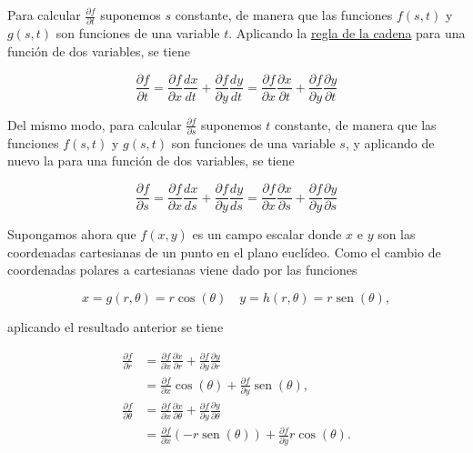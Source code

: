 \documentclass[
  a4paper,
]{scrreport}
\theoremstyle{definition}
\theoremstyle{remark}
\begin{document}
\begin{tcolorbox}[enhanced jigsaw, toprule=.15mm, coltitle=black, colframe=quarto-callout-tip-color-frame, leftrule=.75mm, breakable, left=2mm, opacitybacktitle=0.6, colbacktitle=quarto-callout-tip-color!10!white, bottomrule=.15mm, opacityback=0, title=\textcolor{quarto-callout-tip-color}{\faLightbulb}\hspace{0.5em}{Solución}, bottomtitle=1mm, toptitle=1mm, titlerule=0mm, colback=white, arc=.35mm, rightrule=.15mm]

Para calcular \(\frac{\partial f}{\partial t}\) suponemos \(s\)
constante, de manera que las funciones \(f(s,t)\) y \(g(s,t)\) son
funciones de una variable \(t\). Aplicando la
\href{https://aprendeconalf.es/analisis-manual/13-derivadas-funciones-varias-variables.html\#regla-de-la-cadena}{regla
de la cadena} para una función de dos variables, se tiene

\[
\frac{\partial f}{\partial t} 
= \frac{\partial f}{\partial x}\frac{dx}{dt} + \frac{\partial f}{\partial y}\frac{dy}{dt} 
= \frac{\partial f}{\partial x}\frac{\partial x}{\partial t} + \frac{\partial f}{\partial y}\frac{\partial y}{\partial t}
\]

Del mismo modo, para calcular \(\frac{\partial f}{\partial s}\)
suponemos \(t\) constante, de manera que las funciones \(f(s,t)\) y
\(g(s,t)\) son funciones de una variable \(s\), y aplicando de nuevo la
para una función de dos variables, se tiene

\[
\frac{\partial f}{\partial s} 
= \frac{\partial f}{\partial x}\frac{dx}{ds} + \frac{\partial f}{\partial y}\frac{dy}{ds} 
= \frac{\partial f}{\partial x}\frac{\partial x}{\partial s} + \frac{\partial f}{\partial y}\frac{\partial y}{\partial s}
\]

Supongamos ahora que \(f(x,y)\) es un campo escalar donde \(x\) e \(y\)
son las coordenadas cartesianas de un punto en el plano euclídeo. Como
el cambio de coordenadas polares a cartesianas viene dado por las
funciones

\[
x = g(r,\theta) = r\cos(\theta) \quad y = h(r,\theta) = r\operatorname{sen}(\theta),
\]

aplicando el resultado anterior se tiene

\begin{align*}
\frac{\partial f}{\partial r} 
&= \frac{\partial f}{\partial x}\frac{\partial x}{\partial r} + \frac{\partial f}{\partial y}\frac{\partial y}{\partial r} \\
&= \frac{\partial f}{\partial x}\cos(\theta) + \frac{\partial f}{\partial y}\operatorname{sen}(\theta), \\
\frac{\partial f}{\partial \theta} 
&= \frac{\partial f}{\partial x}\frac{\partial x}{\partial \theta} + \frac{\partial f}{\partial y}\frac{\partial y}{\partial \theta} \\
&= \frac{\partial f}{\partial x}(-r\operatorname{sen}(\theta)) + \frac{\partial f}{\partial y}r\cos(\theta).
\end{align*}

\end{tcolorbox}
\end{document}
